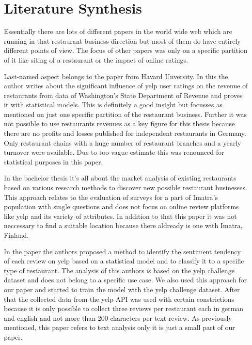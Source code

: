 \section{Literature Synthesis}
\label{sec:synthesis}
Essentially there are lots of different papers in the world wide web which are running in that restaurant business direction but most of them do have entirely different points of view. The focus of other papers was only on a specific partition of it like siting of a restaurant or the impact of online ratings. 

Last-named aspect belongs to the paper from Havard Unversity\cite{CaseOfYelp}. In this the author writes about the significant influence of yelp user ratings on the revenue of restaurants from data of Washington’s State Department of Revenue and proves it with statistical models. This is definitely a good insight but focusses as mentioned on just one specific partition of the restaurant business. Further it was not possible to use restaurants revenues as a key figure for this thesis because there are no profits and losses published for independent restaurants in Germany. Only restaurant chains with a huge number of restaurant branches and a yearly turnover were available. Due to too vague estimate this was renounced for statistical purposes in this paper.

In the bachelor thesis \cite{Imatra} it's all about the market analysis of existing restaurants based on various research methods to discover new possible restaurant businesses. This approach relates to the evaluation of surveys for a part of Imatra's population with single questions and does not focus on online review platforms like yelp and its variety of attributes. In addition to that this paper it was not neccessary to find a suitable location because there aldready is one with Imatra, Finland.

In the paper \cite{Sentiment Analysis} the authors proposed a method to identify the sentiment tendency of each review on yelp based on a statistical model and to classify it to a specific type of restaurant. The analysis of this authors is based on the yelp challenge dataset and does not belong to a specific use case. We also used this approach for our paper and started to train the model with the yelp challenge dataset. After that the collected data from the yelp API was used with certain constrictions because it is only possible to collect three reviews per restaurant each in german and english and not more than 200 characters per text review. As previously mentioned, this paper refers to text analysis only it is just a small part of our paper.  

